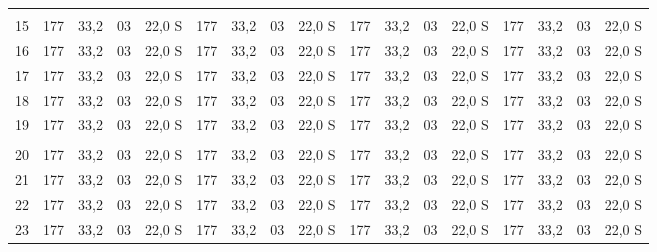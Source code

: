 \documentclass[a4paper]{article}
\begin{document}
\begin{center}
{\begin{tabular}{ c | c c | c c | c c | c c | c c | c c | c c | c c}
    &     &      &    &        &     &      &    &        &     &      &    &        &     &      &    & \\ 
    15 & 177 & 33,2 & 03 & 22,0 S & 177 & 33,2 & 03 & 22,0 S & 177 & 33,2 & 03 & 22,0 S & 177 & 33,2 & 03 & 22,0 S\\ 
    16 & 177 & 33,2 & 03 & 22,0 S & 177 & 33,2 & 03 & 22,0 S & 177 & 33,2 & 03 & 22,0 S & 177 & 33,2 & 03 & 22,0 S\\ 
    17 & 177 & 33,2 & 03 & 22,0 S & 177 & 33,2 & 03 & 22,0 S & 177 & 33,2 & 03 & 22,0 S & 177 & 33,2 & 03 & 22,0 S\\ 
    18 & 177 & 33,2 & 03 & 22,0 S & 177 & 33,2 & 03 & 22,0 S & 177 & 33,2 & 03 & 22,0 S & 177 & 33,2 & 03 & 22,0 S\\ 
    19 & 177 & 33,2 & 03 & 22,0 S & 177 & 33,2 & 03 & 22,0 S & 177 & 33,2 & 03 & 22,0 S & 177 & 33,2 & 03 & 22,0 S\\ 
    &     &      &    &        &     &      &    &        &     &      &    &        &     &      &    & \\ 
    20 & 177 & 33,2 & 03 & 22,0 S & 177 & 33,2 & 03 & 22,0 S & 177 & 33,2 & 03 & 22,0 S & 177 & 33,2 & 03 & 22,0 S\\ 
    21 & 177 & 33,2 & 03 & 22,0 S & 177 & 33,2 & 03 & 22,0 S & 177 & 33,2 & 03 & 22,0 S & 177 & 33,2 & 03 & 22,0 S\\ 
    22 & 177 & 33,2 & 03 & 22,0 S & 177 & 33,2 & 03 & 22,0 S & 177 & 33,2 & 03 & 22,0 S & 177 & 33,2 & 03 & 22,0 S\\ 
    23 & 177 & 33,2 & 03 & 22,0 S & 177 & 33,2 & 03 & 22,0 S & 177 & 33,2 & 03 & 22,0 S & 177 & 33,2 & 03 & 22,0 S\\ 

    \end{tabular}
    }
\end{center}
\end{document}
